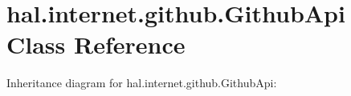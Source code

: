 \hypertarget{classhal_1_1internet_1_1github_1_1_github_api}{}\section{hal.\+internet.\+github.\+Github\+Api Class Reference}
\label{classhal_1_1internet_1_1github_1_1_github_api}


Inheritance diagram for hal.\+internet.\+github.\+Github\+Api\+:
